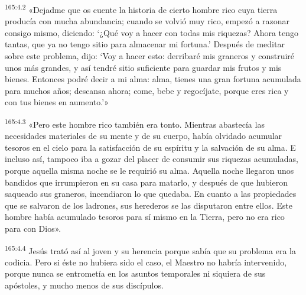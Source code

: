 \par 
\textsuperscript{165:4.2} «Dejadme que os cuente la historia de cierto hombre rico cuya tierra producía con mucha abundancia; cuando se volvió muy rico, empezó a razonar consigo mismo, diciendo: `¿Qué voy a hacer con todas mis riquezas? Ahora tengo tantas, que ya no tengo sitio para almacenar mi fortuna.' Después de meditar sobre este problema, dijo: `Voy a hacer esto: derribaré mis graneros y construiré unos más grandes, y así tendré sitio suficiente para guardar mis frutos y mis bienes. Entonces podré decir a mi alma: alma, tienes una gran fortuna acumulada para muchos años; descansa ahora; come, bebe y regocíjate, porque eres rica y con tus bienes en aumento.'»

\par 
\textsuperscript{165:4.3} «Pero este hombre rico también era tonto. Mientras abastecía las necesidades materiales de su mente y de su cuerpo, había olvidado acumular tesoros en el cielo para la satisfacción de su espíritu y la salvación de su alma. E incluso así, tampoco iba a gozar del placer de consumir sus riquezas acumuladas, porque aquella misma noche se le requirió su alma. Aquella noche llegaron unos bandidos que irrumpieron en su casa para matarlo, y después de que hubieron saqueado sus graneros, incendiaron lo que quedaba. En cuanto a las propiedades que se salvaron de los ladrones, sus herederos se las disputaron entre ellos. Este hombre había acumulado tesoros para sí mismo en la Tierra, pero no era rico para con Dios».

\par 
\textsuperscript{165:4.4} Jesús trató así al joven y su herencia porque sabía que su problema era la codicia. Pero si éste no hubiera sido el caso, el Maestro no habría intervenido, porque nunca se entrometía en los asuntos temporales ni siquiera de sus apóstoles, y mucho menos de sus discípulos.

